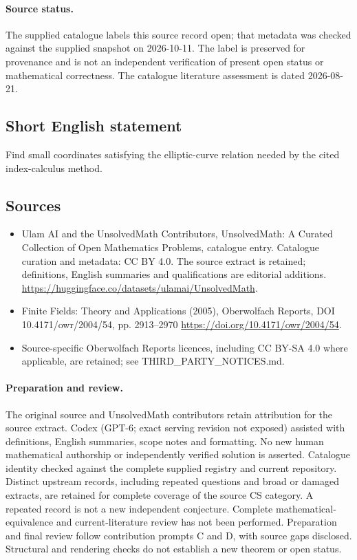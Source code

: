 \documentclass[11pt]{article}
\begin{document}
\paragraph{Source status.}
The supplied catalogue labels this source record open; that metadata was checked against the supplied snapshot on 2026-10-11. The label is preserved for provenance and is not an independent verification of present open status or mathematical correctness. The catalogue literature assessment is dated 2026-08-21.
\subsection{Short English statement}
Find small coordinates satisfying the elliptic-curve relation needed by the cited index-calculus method.
\subsection{Sources}
\begin{itemize}
\item[S1] Ulam AI and the UnsolvedMath Contributors, UnsolvedMath: A Curated Collection of Open Mathematics Problems, catalogue entry. Catalogue curation and metadata: CC BY 4.0. The source extract is retained; definitions, English summaries and qualifications are editorial additions.
\url{https://huggingface.co/datasets/ulamai/UnsolvedMath}.
\item[S2] Finite Fields: Theory and Applications (2005), Oberwolfach Reports, DOI 10.4171/owr/2004/54, pp. 2913--2970
\url{https://doi.org/10.4171/owr/2004/54}.
\item Source-specific Oberwolfach Reports licences, including CC BY-SA 4.0 where applicable, are retained; see THIRD\_PARTY\_NOTICES.md.
\end{itemize}
\paragraph{Preparation and review.}
The original source and UnsolvedMath contributors retain attribution for the source extract. Codex (GPT-6; exact serving revision not exposed) assisted with definitions, English summaries, scope notes and formatting. No new human mathematical authorship or independently verified solution is asserted. Catalogue identity checked against the complete supplied registry and current repository. Distinct upstream records, including repeated questions and broad or damaged extracts, are retained for complete coverage of the source CS category. A repeated record is not a new independent conjecture. Complete mathematical-equivalence and current-literature review has not been performed. Preparation and final review follow contribution prompts C and D, with source gaps disclosed. Structural and rendering checks do not establish a new theorem or open status.
\label{end:statement}
\end{document}

